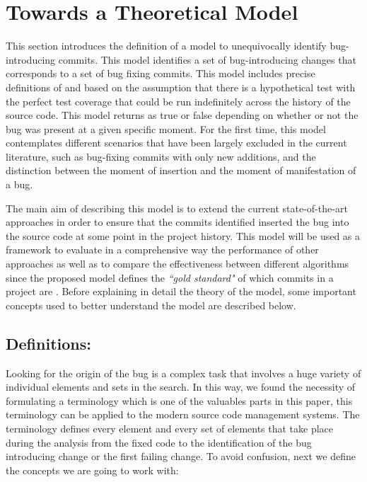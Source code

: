 \documentclass[a4paper, 12pt]{book}
\begin{document}
\section{Towards a Theoretical Model}

This section introduces the definition of a model to unequivocally identify bug-introducing commits. This model identifies a set of bug-introducing changes that corresponds to a set of bug fixing commits. This model includes precise definitions of \BFC and \BIC based on the assumption that there is a hypothetical test with the perfect test coverage that could be run indefinitely across the history of the source code. This model returns as true or false depending on whether or not the bug was present at a given specific moment. For the first time, this model contemplates different scenarios that have been largely excluded in the current literature, such as bug-fixing commits with only new additions, and the distinction between the moment of insertion and the moment of manifestation of a bug. 

The main aim of describing this model is to extend the current state-of-the-art approaches in order to ensure that the commits identified inserted the bug into the source code at some point in the project history. This model will be used as a framework to evaluate in a comprehensive way the performance of other approaches as well as to compare the effectiveness between different algorithms since the proposed model defines the \emph{``gold standard"} of which commits in a project are \BIC.  Before explaining in detail the theory of the model, some important concepts used to better understand the model are described below.%

\subsection{Definitions:}

Looking for the origin of the bug is a complex task that involves a huge variety of individual elements and sets in the search. In this way, we found the necessity of formulating a terminology which is one of the valuables parts in this paper, this terminology can be applied to the modern source code management systems. The terminology defines every element and every set of elements that take place during the analysis from the fixed code to the identification of the bug introducing change or the first failing change. To avoid confusion, next we define the concepts we are going to work with:
\end{document}
